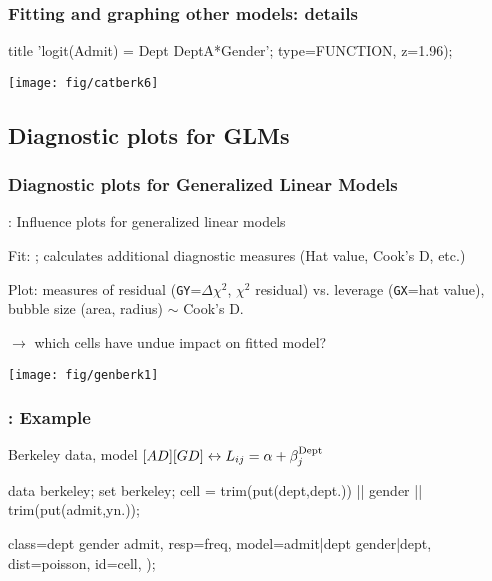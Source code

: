 \begin{frame}[fragile]
   \frametitle{Fitting and graphing other models: details}
\vspace{1ex}
\begin{Input}[label=\fbox{$\cdots$ \texttt{catberk6.sas}},firstnumber=22]
title 'logit(Admit) = Dept DeptA*Gender';
   type=FUNCTION,      
   z=1.96);            
\end{Input}
\begin{center}
  \texttt{[image: fig/catberk6]}
\end{center}

\end{frame}


\subsection{Diagnostic plots for GLMs}
\begin{frame}
\frametitle{Diagnostic plots for Generalized Linear Models}
: Influence plots for generalized linear models \citep{Williams:87}
  \begin{itemize*}
  \item Fit: ; calculates additional diagnostic measures
  (Hat value, Cook's D, etc.)
  \item Plot: measures of residual (\texttt{GY}=$\Delta \chi^2$, $\chi^2$ residual) vs.
  leverage (\texttt{GX}=hat value),  bubble size (area, radius) $\sim$ Cook's D.
  \item $\rightarrow$ which cells have undue impact on fitted model?
  \end{itemize*}
\begin{center}
  \texttt{[image: fig/genberk1]}
\end{center}

\end{frame}

\begin{frame}[fragile]
\frametitle{: Example}
\begin{itemize*}
  \item Berkeley data, model $[AD][GD] \leftrightarrow L_{ij}   = 
	\alpha   +  \beta _j^{\mbox{\scriptsize Dept}} $
  \vspace{3ex}
\begin{Input}[label=\fbox{\texttt{genberk1.sas}}]
data berkeley;
   set berkeley;
   cell = trim(put(dept,dept.)) ||
          gender ||
          trim(put(admit,yn.));
 
   class=dept gender admit,
   resp=freq, 
   model=admit|dept gender|dept, 
   dist=poisson, 
   id=cell,
   );
\end{Input}
\end{itemize*}

\end{frame}

